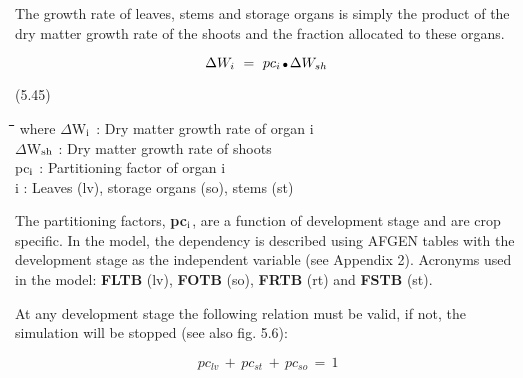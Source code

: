 \documentclass[11pt]{article}
\begin{document}
\bigskip
\bigskip
The growth rate of leaves, stems and storage organs is simply the product of the dry
matter growth rate of the shoots and the fraction allocated to these organs.

\begin{displaymath}
\Delta W _{i} ~=~ pc _{i} \, {\rm \Bullet{0.75ex}}\, \Delta W _{sh} 
\end{displaymath}

 \bigskip
\strut\hfill (5.45)
\nwln
\begin{tabbing}
\hspace{1.27cm}\=\hspace{1.27cm}\=\hspace{1.27cm}\=\hspace{1.27cm}\=%
\hspace{1.27cm}\=\hspace{1.27cm}\=\hspace{1.27cm}\=\hspace{1.27cm}\=%
\hspace{1.27cm}\=\hspace{1.27cm}\=\kill
where\> $\Delta$W$_{{\rm i}}$\> : Dry matter growth rate of organ i\> \> \> \> \> \> \> \> [kg ha$^{{\rm -1}}$ d$^{{\rm -1}}$]\\
\>$\Delta$W$_{{\rm sh}}$\> : Dry matter growth rate of shoots\> \> \> \> \> \> \> \> [kg ha$^{{\rm -1}}$ d$^{{\rm -1}}$]\\
\>pc$_{{\rm i}}$\> : Partitioning factor of organ i\> \> \> \> \> \> \> \> [kg kg$^{{\rm -1}}$]\\
\>i\> : Leaves (lv), storage organs (so), stems (st)
\end{tabbing}

 The partitioning factors, {\bf pc$_{{\rm i}}$}, are a function of development stage and are crop specific. In
the model, the dependency is described using AFGEN tables with the development stage
as the independent variable (see Appendix 2). Acronyms used in the model: {\bf FLTB} (lv),
{\bf FOTB} (so), {\bf FRTB} (rt) and {\bf FSTB} (st).

\bigskip
\bigskip
At any development stage the following relation must be valid, if not, the simulation will
be stopped (see also fig. 5.6):

\begin{displaymath}
\, pc _{lv} \, +\, pc _{st} \, +\, pc _{so} \, =\, 1
\end{displaymath}
\end{document}
